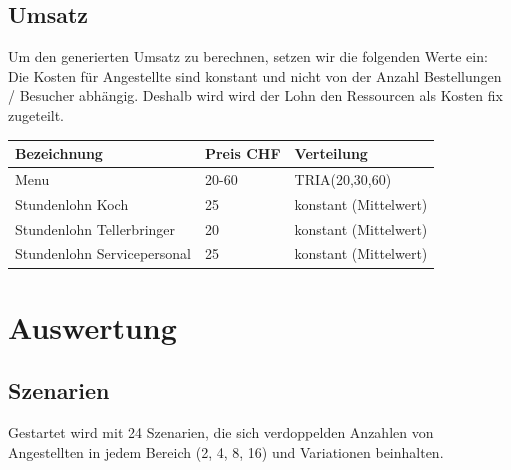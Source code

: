 \documentclass[ngerman,a4paper,12pt]{scrreprt}
\begin{document}
	\section{Umsatz}
\noindent
	Um den generierten Umsatz zu berechnen, setzen wir die folgenden Werte ein:
Die Kosten für Angestellte sind konstant und nicht von der Anzahl Bestellungen / Besucher abhängig. Deshalb wird wird der Lohn den Ressourcen als Kosten fix zugeteilt.\\

\begin{tabularx}{\textwidth}{|l|l|X|}
		\hline
		\textbf{Bezeichnung} & \textbf{Preis CHF} & \textbf{Verteilung}  \\
		\hline
		Menu & 20-60 & TRIA(20,30,60)  \\
		\hline
		Stundenlohn Koch & 25 & konstant (Mittelwert)\\
		Stundenlohn Tellerbringer & 20 & konstant (Mittelwert) \\
		Stundenlohn Servicepersonal & 25 & konstant (Mittelwert)\\
		\hline
\end{tabularx}
	
\chapter{Auswertung}
	\section{Szenarien}
			Gestartet wird mit 24 Szenarien, die sich verdoppelden Anzahlen von Angestellten in jedem Bereich (2, 4, 8, 16) und Variationen beinhalten.
		
\end{document}

